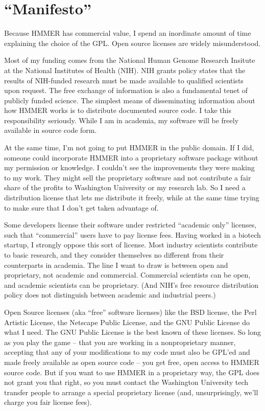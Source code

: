 \section{``Manifesto''}

Because HMMER has commercial value, I spend an inordinate amount of
time explaining the choice of the GPL. Open source licenses are widely
misunderstood.

Most of my funding comes from the National Human Genome Research
Insitute at the National Institutes of Health (NIH). NIH grants policy
states that the results of NIH-funded research must be made available
to qualified scientists upon request. The free exchange of information
is also a fundamental tenet of publicly funded science. The simplest
means of disseminating information about how HMMER works is to
distribute documented source code. I take this responsibility
seriously. While I am in academia, my software will be freely
available in source code form.

At the same time, I'm not going to put HMMER in the public domain.  If
I did, someone could incorporate HMMER into a proprietary software
package without my permission or knowledge. I couldn't see the
improvements they were making to my work.  They might sell the
proprietary software and not contribute a fair share of the profits to
Washington University or my research lab. So I need a distribution
license that lets me distribute it freely, while at the same time
trying to make sure that I don't get taken advantage of.

Some developers license their software under restricted ``academic
only'' licenses, such that ``commercial'' users have to pay license
fees. Having worked in a biotech startup, I strongly oppose this sort
of license. Most industry scientists contribute to basic research, and
they consider themselves no different from their counterparts in
academia. The line I want to draw is between open and proprietary, not
academic and commercial. Commercial scientists can be open, and
academic scientists can be proprietary. (And NIH's free resource
distribution policy does not distinguish between academic and
industrial peers.)

Open Source licenses (aka ``free'' software licenses) like the BSD
license, the Perl Artistic License, the Netscape Public License, and
the GNU Public License do what I need. The GNU Public License is the
best known of these licenses. So long as you play the game -- that you
are working in a nonproprietary manner, accepting that any of your
modifications to my code must also be GPL'ed and made freely available
as open source code -- you get free, open access to HMMER source code.
But if you want to use HMMER in a proprietary way, the GPL does not
grant you that right, so you must contact the Washington University
tech transfer people to arrange a special proprietary license (and,
unsurprisingly, we'll charge you fair license fees).

